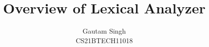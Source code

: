 \documentclass[journal,12pt,twocolumn]{IEEEtran}
\DeclareMathOperator*{\Res}{Res}
\begin{document}
\newtheorem{theorem}{Theorem}[section]
\newtheorem{problem}{Problem}
\newtheorem{proposition}{Proposition}[section]
\newtheorem{lemma}{Lemma}[section]
\newtheorem{corollary}[theorem]{Corollary}
\newtheorem{example}{Example}[section]
\newtheorem{definition}[problem]{Definition}
\newcommand{\BEQA}{\begin{eqnarray}}
\newcommand{\EEQA}{\end{eqnarray}}
\newcommand{\define}{\stackrel{\triangle}{=}}

\providecommand{\mbf}{\mathbf}
\providecommand{\pr}[1]{\ensuremath{\Pr\left(#1\right)}}
\providecommand{\qfunc}[1]{\ensuremath{Q\left(#1\right)}}
\providecommand{\sbrak}[1]{\ensuremath{{}\left[#1\right]}}
\providecommand{\lsbrak}[1]{\ensuremath{{}\left[#1\right.}}
\providecommand{\rsbrak}[1]{\ensuremath{{}\left.#1\right]}}
\providecommand{\brak}[1]{\ensuremath{\left(#1\right)}}
\providecommand{\lbrak}[1]{\ensuremath{\left(#1\right.}}
\providecommand{\rbrak}[1]{\ensuremath{\left.#1\right)}}
\providecommand{\cbrak}[1]{\ensuremath{\left\{#1\right\}}}
\providecommand{\lcbrak}[1]{\ensuremath{\left\{#1\right.}}
\providecommand{\rcbrak}[1]{\ensuremath{\left.#1\right\}}}
\theoremstyle{remark}
\newtheorem{rem}{Remark}
\newcommand{\sgn}{\mathop{\mathrm{sgn}}}
\providecommand{\abs}[1]{\left\vert#1\right\vert}
\providecommand{\res}[1]{\Res\displaylimits_{#1}} 
\providecommand{\norm}[1]{\left\lVert#1\right\rVert}
\providecommand{\mtx}[1]{\mathbf{#1}}
\providecommand{\mean}[1]{E\left[ #1 \right]}   
\providecommand{\fourier}{\overset{\mathcal{F}}{ \rightleftharpoons}}
\providecommand{\system}[1]{\overset{\mathcal{#1}}{ \longleftrightarrow}}
\newcommand{\solution}{\noindent \textbf{Solution: }}
\newcommand{\cosec}{\,\text{cosec}\,}
\providecommand{\dec}[2]{\ensuremath{\overset{#1}{\underset{#2}{\gtrless}}}}
\newcommand{\myvec}[1]{\ensuremath{\begin{pmatrix}#1\end{pmatrix}}}
\newcommand{\mydet}[1]{\ensuremath{\begin{vmatrix}#1\end{vmatrix}}}
\renewcommand{\vec}[1]{\boldsymbol{\mathbf{#1}}}
\def\putbox#1#2#3{\makebox[0in][l]{\makebox[#1][l]{}\raisebox{\baselineskip}[0in][0in]{\raisebox{#2}[0in][0in]{#3}}}}
     \def\rightbox#1{\makebox[0in][r]{#1}}
     \def\centbox#1{\makebox[0in]{#1}}
     \def\topbox#1{\raisebox{-\baselineskip}[0in][0in]{#1}}
     \def\midbox#1{\raisebox{-0.5\baselineskip}[0in][0in]{#1}}

\vspace{3cm}
\title{Overview of Lexical Analyzer}
\author{Gautam Singh\\CS21BTECH11018}
\maketitle
\tableofcontents
\bigskip
\end{document}
